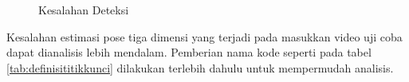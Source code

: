 \begin{figure}[htbp]
    \begin{center}
    \end{center}
    \vspace{-20pt}
    \captionsetup{labelfont=bf, textfont=bf}
    \caption{Kesalahan Deteksi}
    \vspace{-10pt}
    \captionsetup{labelfont=md, textfont=md}
    \label{fig:bro131}
\end{figure}

\pagebreak

Kesalahan estimasi pose tiga dimensi yang terjadi pada masukkan video uji coba dapat dianalisis
lebih mendalam. Pemberian nama kode seperti pada tabel \ref{tab:definisititikkunci} dilakukan
terlebih dahulu untuk mempermudah analisis.


